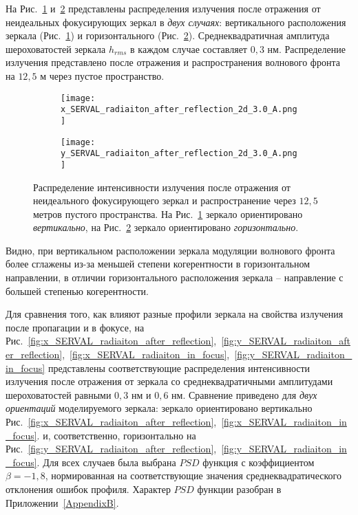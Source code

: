 На Рис.~\ref{fig:x_SERVAL_radiaiton_after_reflection_2d_3A} и~\ref{fig:y_SERVAL_radiaiton_after_reflection_2d_3A} представлены распределения излучения после отражения от неидеальных фокусирующих зеркал в \textit{двух случаях}: вертикального расположения зеркала (Рис.~\ref{fig:x_SERVAL_radiaiton_after_reflection_2d_3A}) и горизонтального (Рис.~\ref{fig:y_SERVAL_radiaiton_after_reflection_2d_3A}). Среднеквадратичная амплитуда шероховатостей зеркала $h_{rms}$ в каждом случае составляет $0,3$ нм. Распределение излучения представлено после отражения и распространения волнового фронта на $12,5$ м через пустое пространство.
\begin{figure}[H]
	\centering
	\begin{subfigure}{0.49\textwidth}
		\centering
		\texttt{[image: x\_SERVAL\_radiaiton\_after\_reflection\_2d\_3.0\_A.png]}
		\caption{}
		\label{fig:x_SERVAL_radiaiton_after_reflection_2d_3A}
	\end{subfigure}
	\begin{subfigure}{0.49\textwidth}
		\centering
		\texttt{[image: y\_SERVAL\_radiaiton\_after\_reflection\_2d\_3.0\_A.png]}
		\caption{}
		\label{fig:y_SERVAL_radiaiton_after_reflection_2d_3A}
	\end{subfigure}
	\caption{Распределение интенсивности излучения после отражения от неидеального фокусирующего зеркал и распространение через $12,5$ метров пустого пространства. На Рис.~\ref{fig:x_SERVAL_radiaiton_after_reflection_2d_3A} зеркало ориентировано \textit{вертикально}, на Рис.~\ref{fig:y_SERVAL_radiaiton_after_reflection_2d_3A} зеркало ориентировано \textit{горизонтально}.}
	\label{fig:SERVAL_radiaiton_after_reflection_2d_3A}
\end{figure}
\noindent Видно, при вертикальном расположении зеркала модуляции волнового фронта более сглажены из-за меньшей степени когерентности в горизонтальном направлении, в отличии горизонтального расположения зеркала -- направление с большей степенью когерентности.

Для сравнения того, как влияют разные профили зеркала на свойства излучения после пропагации и в фокусе, на Рис.~\ref{fig:x_SERVAL_radiaiton_after_reflection},~\ref{fig:y_SERVAL_radiaiton_after_reflection},~\ref{fig:x_SERVAL_radiaiton_in_focus},~\ref{fig:y_SERVAL_radiaiton_in_focus} представлены соответствующие распределения интенсивности излучения после отражения от зеркала со среднеквадратичными амплитудами шероховатостей равными $0,3$ нм и $0,6$ нм. Сравнение приведено для \textit{двух ориентаций} моделируемого зеркала: зеркало ориентировано вертикально Рис.~\ref{fig:x_SERVAL_radiaiton_after_reflection},~\ref{fig:x_SERVAL_radiaiton_in_focus}. и, соответственно, горизонтально на Рис.~\ref{fig:y_SERVAL_radiaiton_after_reflection},~\ref{fig:y_SERVAL_radiaiton_in_focus}. Для всех случаев была выбрана $PSD$ функция с коэффициентом $\beta = -1,8$, нормированная на соответствующие значения среднеквадратического отклонения ошибок профиля. Характер $PSD$ функции разобран в Приложении~\ref{AppendixB}.

